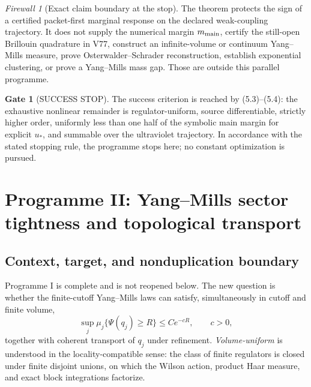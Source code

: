 \documentclass[11pt]{article}
\theoremstyle{definition}
\newtheorem{gate}[theorem]{Gate}
\theoremstyle{remark}
\newtheorem{firewall}[theorem]{Firewall}
\begin{document}
\begin{firewall}[Exact claim boundary at the stop]
The theorem protects the sign of a certified packet-first marginal response
on the declared weak-coupling trajectory.  It does not supply the numerical
margin $m_{\rm main}$, certify the still-open Brillouin quadrature in V77,
construct an infinite-volume or continuum Yang--Mills measure, prove
Osterwalder--Schrader reconstruction, establish exponential clustering, or
prove a Yang--Mills mass gap.  Those are outside this parallel programme.
\end{firewall}

\begin{gate}[SUCCESS STOP]
The success criterion is reached by (5.3)--(5.4): the exhaustive nonlinear
remainder is regulator-uniform, source differentiable, strictly higher order,
uniformly less than one half of the symbolic main margin for explicit $u_*$,
and summable over the ultraviolet trajectory.  In accordance with the stated
stopping rule, the programme stops here; no constant optimization is pursued.
\end{gate}

\clearpage
\section{Programme II: Yang--Mills sector tightness and topological
transport}
\label{sec:sector-programme}

\subsection{Context, target, and nonduplication boundary}

Programme I is complete and is not reopened below.  The new question is
whether the finite-cutoff Yang--Mills laws can satisfy, simultaneously in
cutoff and finite volume,
\[
 \sup_j\mu_j\{\Psi(q_j)\ge R\}\le C e^{-cR},\qquad c>0,       \tag{6.1}
\]
together with coherent transport of $q_j$ under refinement.
\emph{Volume-uniform} is understood in the locality-compatible sense: the
class of finite regulators is closed under finite disjoint unions, on which
the Wilson action, product Haar measure, and exact block integrations
factorize.
\end{document}
